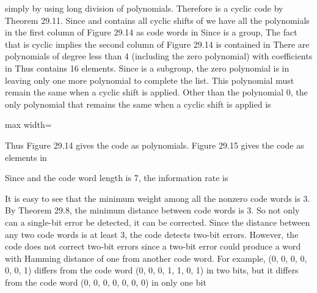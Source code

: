 \documentclass[11pt,oneside]{article}
\begin{document}
\begin{BookBody}
\noindent simply by using long division of polynomials. Therefore  is a cyclic code by Theorem 29.11. Since  and  contains all cyclic shifts of  we have all the polynomials in the first column of Figure 29.14 as code words in  Since  is a group,  The fact that  is cyclic implies the second column of Figure 29.14 is contained in  There are  polynomials of degree less than 4 (including the zero polynomial) with coefficients in  Thus  contains 16 elements. Since  is a subgroup, the zero polynomial is in  leaving only one more polynomial to complete the list. This polynomial must remain the same when a cyclic shift is applied. Other than the polynomial 0, the only polynomial that remains the same when a cyclic shift is applied is

\begin{center}\begin{adjustbox}{max width=\linewidth}\end{adjustbox}\end{center}

\noindent Thus Figure 29.14 gives the code  as polynomials. Figure 29.15 gives the code as elements in 

Since  and the code word length is 7, the information rate is 

It is easy to see that the minimum weight among all the nonzero code words is 3. By Theorem 29.8, the minimum distance between code words is 3. So not only can a single-bit error be detected, it can be corrected. Since the distance between any two code words is at least 3, the code detects two-bit errors. However, the code does not correct two-bit errors since a two-bit error could produce a word with Hamming distance of one from another code word. For example, (0, 0, 0, 0, 0, 0, 1) differs from the code word (0, 0, 0, 1, 1, 0, 1) in two bits, but it differs from the code word (0, 0, 0, 0, 0, 0, 0) in only one bit\BookEnd{\blacktriangle}


\end{BookBody}
\end{document}
